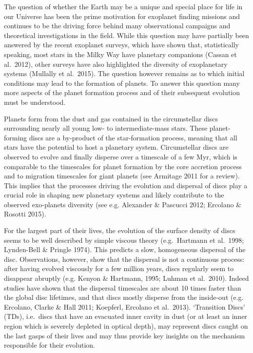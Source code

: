 \documentclass[10pt,fleqn,twoside]{article}
\begin{document}
The question of whether the Earth may be a unique and special place for life
in our Universe has been the prime motivation for exoplanet finding missions
and continues to be the driving force behind many observational campaigns and
theoretical investigations in the field. While this question may have
partially been answered by the recent exoplanet surveys, which have shown
 that, statistically speaking, most stars in the Milky Way have planetary
  companions (Cassan et al.\ 2012), other surveys have
also highlighted the diversity of exoplanetary systems (Mullally et
  al.\ 2015). The question however remains as to which
initial conditions may lead to the formation of planets. To answer
this question many more aspects of the planet formation process and of their
subsequent evolution must be understood.

Planets form from the dust and gas contained in the circumstellar discs surrounding nearly all young low- to intermediate-mass stars. These planet-forming discs are a by-product of the star-formation process, meaning that all stars have the potential to host a planetary system.
Circumstellar discs are observed to evolve and finally disperse over a
timescale of a few Myr, which is comparable to
the timescales for planet formation by the core accretion process
 and to migration timescales for giant planets
(see Armitage 2011 for a review). This implies that the processes driving the
evolution and dispersal of discs play a crucial role in shaping new
planetary systems and likely contribute to the observed exo-planets
diversity (see e.g. Alexander \& Pascucci 2012; Ercolano \& Rosotti
2015).  

For the largest part
of their lives, the evolution of the surface density of discs seems to be well
described by simple viscous theory (e.g.\ Hartmann et al.\ 1998; Lynden-Bell
\& Pringle 1974). This predicts a slow, homogeneous dispersal of the
disc. Observations, however, show that the dispersal is not a
continuous process: after having evolved viscously for a few million
years, discs regularly seem to disappear abruptly  (e.g. Kenyon \& Hartmann, 1995; Luhman
et al.\ 2010). Indeed studies have shown that the dispersal
timescales are about 10 times faster than the global disc lifetimes, and
that discs mostly disperse from the inside-out (e.g. Ercolano, Clarke \&
Hall 2011; Koepferl, Ercolano et al.\ 2013). `Transition Discs' (TDs), i.e.\ discs
that have an evacuated inner cavity in dust (or at least an inner region
which is severely depleted in optical depth), may represent discs caught on
the last gasps of their lives and may thus provide key insights on the
mechanism responsible for their evolution. 
\end{document}
